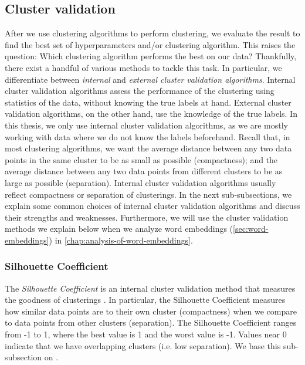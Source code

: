 \subsection{Cluster validation}
\label{sec:cluster-validation}
After we use clustering algorithms to perform clustering, we evaluate the result to find the best set of hyperparameters and/or clustering algorithm. This raises the question: Which clustering algorithm performs the best on our data? Thankfully, there exist a handful of various methods to tackle this task. In particular, we differentiate between \textit{internal} and \textit{external cluster validation algorithms}. Internal cluster validation algorithms assess the performance of the clustering using statistics of the data, without knowing the true labels at hand. External cluster validation algorithms, on the other hand, use the knowledge of the true labels. In this thesis, we only use internal cluster validation algorithms, as we are mostly working with data where we do not know the labels beforehand. Recall that, in most clustering algorithms, we want the average distance between any two data points in the same cluster to be as small as possible (compactness); and the average distance between any two data points from different clusters to be as large as possible (separation). Internal cluster validation algorithms usually reflect compactness or separation of clusterings. In the next sub-subsections, we explain some common choices of internal cluster validation algorithms and discuss their strengths and weaknesses. Furthermore, we will use the cluster validation methods we explain below when we analyze word embeddings (\cref{sec:word-embeddings}) in \cref{chap:analysis-of-word-embeddings}.

\subsubsection{Silhouette Coefficient}
\label{sec:silhouette-coefficient}
The \textit{Silhouette Coefficient} is an internal cluster validation method that measures the goodness of clusterings \cite[p. 87]{Kaufman1990}. In particular, the Silhouette Coefficient measures how similar data points are to their own cluster (compactness) when we compare to data points from other clusters (separation). The Silhouette Coefficient ranges from -1 to 1, where the best value is 1 and the worst value is -1. Values near 0 indicate that we have overlapping clusters (i.e. low separation). We base this sub-subsection on \cite[p. 87]{Kaufman1990}.

